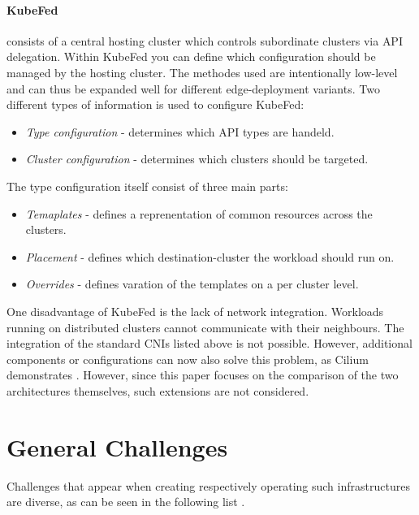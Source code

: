 \documentclass[MSC,Master,english]{twbook}%
\begin{document}
\paragraph{\ac{KubeFed}} consists of a central hosting cluster which controls subordinate clusters via \ac{API} delegation. Within \ac{KubeFed} you can define which configuration should be managed by the hosting cluster. The methodes used are intentionally low-level and can thus be expanded well for different edge-deployment variants. Two different types of information is used to configure \ac{KubeFed}\cite{kubefed-github}:

\begin{itemize}
    \item \textit{Type configuration} - determines which \ac{API} types are handeld.
    \item \textit{Cluster configuration} - determines which clusters should be targeted.
\end{itemize}

The type configuration itself consist of three main parts:

\begin{itemize}
    \item \textit{Temaplates} - defines a reprenentation of common resources across the clusters.
    \item \textit{Placement} - defines which destination-cluster the workload should run on.
    \item \textit{Overrides} - defines varation of the templates on a per cluster level.
\end{itemize}

One disadvantage of KubeFed is the lack of network integration. Workloads running on distributed clusters cannot communicate with their neighbours. The integration of the standard CNIs listed above is not possible. However, additional components or configurations can now also solve this problem, as Cilium demonstrates \cite{ciliummesh}. However, since this paper focuses on the comparison of the two architectures themselves, such extensions are not considered.

\section{General Challenges} 
\label{sec:generalchallanges}
Challenges that appear when creating respectively operating such infrastructures are diverse, as can be seen in the following list \cite{intro-edge}.
\end{document}
